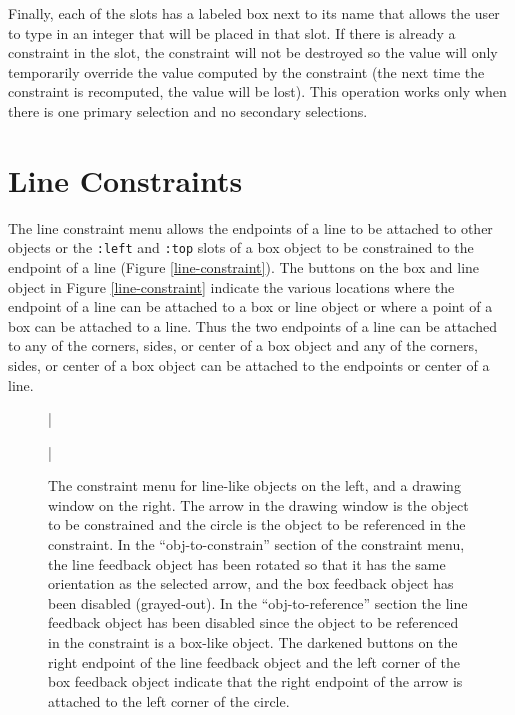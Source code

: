 Finally, each of the slots has a labeled box next to its name that allows
the user to type in an integer that will be placed in that slot.
If there is already a constraint in the slot, the constraint will not be
destroyed so the value will only temporarily
override the value computed by the constraint (the next time the constraint
is recomputed, the value will be lost).  This operation works only when
there is one primary selection and no secondary selections.

\section{Line Constraints}
\label{line-constraint-section}

The line constraint menu allows the endpoints of a line to be attached to
other objects or the {\tt :left} and {\tt :top} slots of a box object to be
constrained to the endpoint of a line (Figure \ref{line-constraint}).
The buttons on the box and line object in Figure \ref{line-constraint}
indicate the various locations where the endpoint of a line can be attached
to a box or line object or where a point of
a box can be attached to a line.
Thus the two endpoints of a line can be attached to any of the corners, sides,
or center of a box object and any of the corners, sides, or center of a box
object can be attached to the endpoints or center of a line.

\begin{figure}
\bar{}
\vspace{0.5 line}
\begin{center}
\end{center}
\caption{
The constraint menu for line-like objects on the left, and a
drawing window on the right.  The arrow in the drawing window is the
object to be constrained and the circle is the
object to be referenced in the constraint.
In the ``obj-to-constrain'' section
of the constraint
menu, the line feedback object has been rotated so that it has the
same orientation as the selected arrow, and the box feedback object
has been disabled (grayed-out). In the ``obj-to-reference'' section
the line feedback object has been disabled since the object to be
referenced in the constraint
is a box-like object. The darkened buttons on the right endpoint of
the line feedback object and the left corner of the box feedback object
indicate that the right endpoint of the arrow is attached to the left
corner of the circle.
}
\bar{}
\end{figure}

